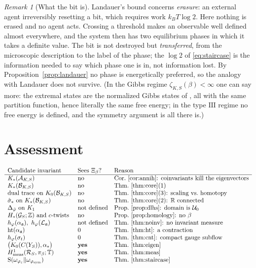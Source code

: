 \documentclass[11pt]{amsart}
\numberwithin{equation}{section}
\theoremstyle{definition}
\theoremstyle{remark}
\newtheorem{remark}[theorem]{Remark}
\newcommand{\Z}{\mathbb{Z}}
\newcommand{\R}{\mathbb{R}}
\newcommand{\T}{\mathbb{T}}
\newcommand{\cA}{\mathcal{A}}
\newcommand{\cB}{\mathcal{B}}
\newcommand{\cG}{\mathcal{G}}
\newcommand{\cL}{\mathcal{L}}
\newcommand{\cR}{\mathcal{R}}
\newcommand{\cU}{\mathcal{U}}
\newcommand{\aaa}{\mathfrak{a}}
\newcommand{\Ent}{\mathrm{S}}
\newcommand{\htop}{\mathrm{ht}}
\newcommand{\phisym}{\varphi_{\mathrm{sym}}}
\begin{document}
\begin{remark}[What the bit is]\label{rem:landauer}
Landauer's bound concerns \emph{erasure}: an external agent irreversibly resetting a bit,
which requires work $k_BT\log2$. Here nothing is erased and no agent acts. Crossing a
threshold makes an observable well defined almost everywhere, and the system then has two
equilibrium phases in which it takes a definite value. The bit is not destroyed but
\emph{transferred}, from the microscopic description to the label of the phase; the $\log2$
of \eqref{eq:staircase} is the information needed to say which phase one is in, not
information lost. By Proposition~\ref{prop:landauer} no phase is energetically preferred,
so the analogy with Landauer does not survive. (In the Gibbs regime $\zeta_{K,S}(\beta)<\infty$
one can say more: the extremal states are the normalized Gibbs states of \cite[Thm.~3.6]{Main},
all with the same partition function, hence literally the same free energy; in the type
$\mathrm{III}$ regime no free energy is defined, and the symmetry argument is all there is.)
\end{remark}

\section{Assessment}

\[
\begin{array}{lll}
\text{Candidate invariant} & \text{Sees }\Xi_\beta? & \text{Reason}\\\hline
K_*(\cA_{K,S}) & \text{no} & \text{Cor.~\ref{cor:annih}: coinvariants kill the eigenvectors}\\
K_*(\cB_{K,S}) & \text{no} & \text{Thm.~\ref{thm:core}(1)}\\
\text{dual trace on }K_0(\cB_{K,S}) & \text{no} & \text{Thm.~\ref{thm:core}(3): scaling vs.\ homotopy}\\
\hat\sigma_*\ \text{on}\ K_*(\cB_{K,S}) & \text{no} & \text{Thm.~\ref{thm:core}(2): }\R\ \text{connected}\\
\Delta_{\hat\varphi}\ \text{on}\ K_1 & \text{not defined} & \text{Prop.~\ref{prop:dlhs}: domain is }\cU_0\\
H_*(\cG_S;\Z)\ \text{and }c\text{-twists} & \text{no} & \text{Prop.~\ref{prop:homology}: no }\beta\\
h_\varphi(\alpha_\aaa),\ h_\varphi(\cL_\aaa) & \text{not defined} & \text{Thm.~\ref{thm:noinv}: no invariant measure}\\
\htop(\alpha_\aaa) & 0 & \text{Thm.~\ref{thm:ht}: a contraction}\\
h_\varphi(\sigma_t) & 0 & \text{Thm.~\ref{thm:cnt}: compact gauge subflow}\\
\bigl(K_0(C(Y_S)),\alpha_*\bigr) & \textbf{yes} & \text{Thm.~\ref{thm:eigen}}\\
H^1_{\mathrm{meas}}(\cR_S,\pi_\beta;\T) & \textbf{yes} & \text{Thm.~\ref{thm:meas}}\\
\Ent(\omega_{\varphi_\varepsilon}\|\omega_{\phisym}) & \textbf{yes} & \text{Thm.~\ref{thm:staircase}}
\end{array}
\]
\end{document}
